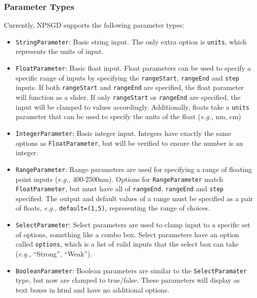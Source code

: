 \documentclass{article}
\begin{document}
\subsubsection{Parameter Types}
\label{sec:ParameterTypes}
Currently, NPSGD supports the following parameter types:
\begin{itemize}
    \item \texttt{StringParameter}: Basic string input. The only extra option is
              \texttt{units}, which represents the units of input.

    \item \texttt{FloatParameter}: Basic float input. Float parameters can be
              used to specify a specific range of inputs by specifying the
              \texttt{rangeStart}, \texttt{rangeEnd} and \texttt{step} inputs. If both
              \texttt{rangeStart} and \texttt{rangeEnd} are specified, the float
              parameter will function as a slider. If only \texttt{rangeStart} or
              \texttt{rangeEnd} are specified, the input will be clamped to values
              accordingly. Additionally, floats take a \texttt{units} parameter that
              can be used to specify the units of the float (\textit{e.g.,} nm, cm)

    \item \texttt{IntegerParameter}: Basic integer input. Integers have exactly
              the same options as \texttt{FloatParameter}, but will be verified to
              ensure the number is an integer.

    \item \texttt{RangeParameter}: Range parameters are used for specifying a
              range of floating point inputs (\textit{e.g.,} 400-2500nm). Options for
              \texttt{RangeParameter} match \texttt{FloatParameter}, but must
              have all of \texttt{rangeEnd}, \texttt{rangeEnd} and \texttt{step}
              specified. The output and default values of a range must be
              specified as a pair of floats, \textit{e.g.,} \texttt{default=(1,5)},
              representing the range of choices.

    \item \texttt{SelectParameter}: Select parameters are used to clamp input to
              a specific set of options, something like a combo box. Select
              parameters have an option called \texttt{options}, which is a list
              of valid inputs that the select box can take (\textit{e.g.,} ``Strong'',
              ``Weak'').

    \item \texttt{BooleanParameter}: Boolean parameters are similar to the
              \texttt{SelectParamater} type, but now are clamped to true/false. 
              These parameters will display as text boxes in html and have no
              additional options.
\end{itemize}
\end{document}
